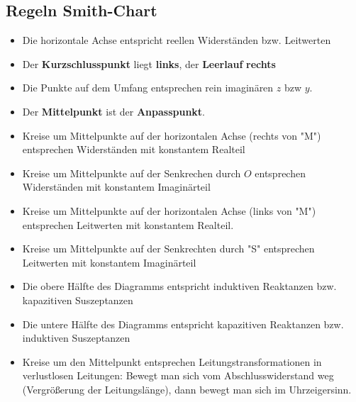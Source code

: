 \documentclass[english]{latex4ei/latex4ei_sheet}
\begin{document}
\begin{sectionbox}
	\subsection{Regeln Smith-Chart}
	\begin{itemize}
		\item Die horizontale Achse entspricht reellen Widerständen bzw. Leitwerten
		\item Der \textbf{Kurzschlusspunkt} liegt \textbf{links}, der \textbf{Leerlauf} \textbf{rechts}
		\item Die Punkte auf dem Umfang entsprechen rein imaginären $z$ bzw $y$.
		\item Der \textbf{Mittelpunkt} ist der \textbf{Anpasspunkt}.
		\item Kreise um Mittelpunkte auf der horizontalen Achse (rechts von "M") entsprechen Widerständen mit konstantem Realteil
		\item Kreise um Mittelpunkte auf der Senkrechen durch $O$ entsprechen Widerständen mit konstantem Imaginärteil
		\item Kreise um Mittelpunkte auf der horizontalen Achse (links von "M") entsprechen Leitwerten mit konstantem Realteil.
		\item Kreise um Mittelpunkte auf der Senkrechten durch "S" entsprechen Leitwerten mit konstantem Imaginärteil
		\item Die obere Hälfte des Diagramms entspricht induktiven Reaktanzen bzw. kapazitiven Suszeptanzen
		\item Die untere Hälfte des Diagramms entspricht kapazitiven Reaktanzen bzw. induktiven Suszeptanzen
		\item Kreise um den Mittelpunkt entsprechen Leitungstransformationen in verlustlosen Leitungen: Bewegt man sich vom Abschlusswiderstand weg (Vergrößerung der Leitungslänge), dann bewegt man sich im Uhrzeigersinn.
	\end{itemize}
\end{sectionbox}
\end{document}

